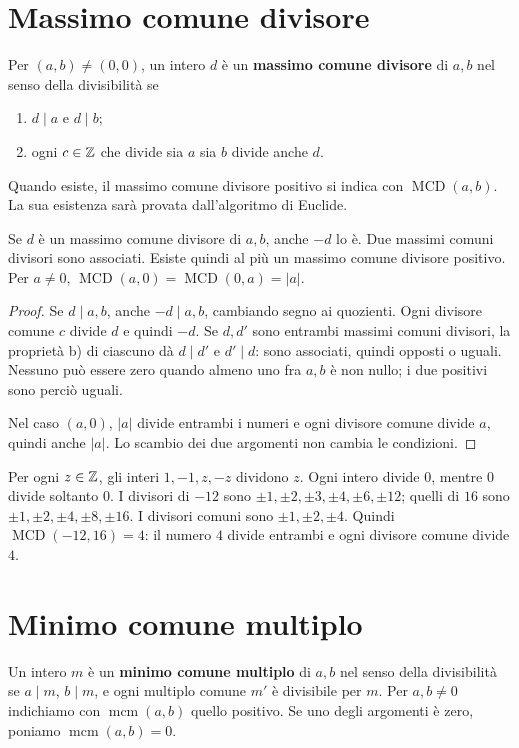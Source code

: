 \section{Massimo comune divisore}
\begin{definizione}
Per $(a,b)\ne(0,0)$, un intero $d$ è un \textbf{massimo comune divisore} di $a,b$ nel senso della divisibilità se
\begin{enumerate}[label=\alph*)]
  \item $d\mid a$ e $d\mid b$;
  \item ogni $c\in\mathbb{Z}$ che divide sia $a$ sia $b$ divide anche $d$.
\end{enumerate}
Quando esiste, il massimo comune divisore positivo si indica con $\operatorname{MCD}(a,b)$. La sua esistenza sarà provata dall'algoritmo di Euclide.
\end{definizione}

\begin{proposizione}
Se $d$ è un massimo comune divisore di $a,b$, anche $-d$ lo è. Due massimi comuni divisori sono associati. Esiste quindi al più un massimo comune divisore positivo. Per $a\ne0$, $\operatorname{MCD}(a,0)=\operatorname{MCD}(0,a)=|a|$.
\end{proposizione}
\begin{proof}
Se $d\mid a,b$, anche $-d\mid a,b$, cambiando segno ai quozienti. Ogni divisore comune $c$ divide $d$ e quindi $-d$. Se $d,d'$ sono entrambi massimi comuni divisori, la proprietà b) di ciascuno dà $d\mid d'$ e $d'\mid d$: sono associati, quindi opposti o uguali. Nessuno può essere zero quando almeno uno fra $a,b$ è non nullo; i due positivi sono perciò uguali.

Nel caso $(a,0)$, $|a|$ divide entrambi i numeri e ogni divisore comune divide $a$, quindi anche $|a|$. Lo scambio dei due argomenti non cambia le condizioni.
\end{proof}

\begin{esempio}
Per ogni $z\in\mathbb{Z}$, gli interi $1,-1,z,-z$ dividono $z$. Ogni intero divide $0$, mentre $0$ divide soltanto $0$. I divisori di $-12$ sono $\pm1,\pm2,\pm3,\pm4,\pm6,\pm12$; quelli di $16$ sono $\pm1,\pm2,\pm4,\pm8,\pm16$. I divisori comuni sono $\pm1,\pm2,\pm4$. Quindi $\operatorname{MCD}(-12,16)=4$: il numero $4$ divide entrambi e ogni divisore comune divide $4$.
\end{esempio}

\section{Minimo comune multiplo}
\begin{definizione}
Un intero $m$ è un \textbf{minimo comune multiplo} di $a,b$ nel senso della divisibilità se $a\mid m$, $b\mid m$, e ogni multiplo comune $m'$ è divisibile per $m$. Per $a,b\ne0$ indichiamo con $\operatorname{mcm}(a,b)$ quello positivo. Se uno degli argomenti è zero, poniamo $\operatorname{mcm}(a,b)=0$.
\end{definizione}

